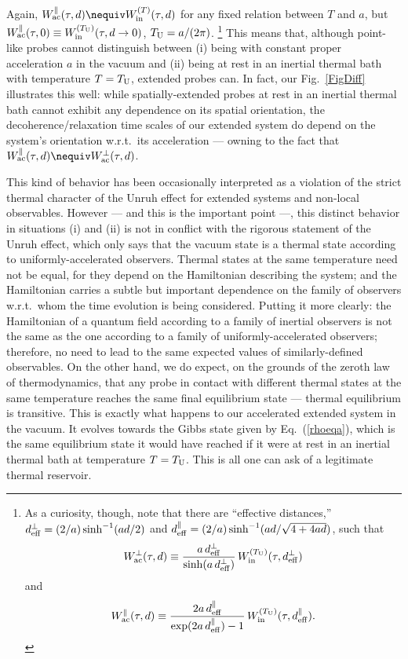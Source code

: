 \documentclass[]{nature}
\begin{document}
{Again, $W^{\parallel}_{\rm ac}(\tau,d) \nequiv W^{(T)}_{\rm in}(\tau,d)$ for any fixed relation between $T$ and $a$, 
but $W^\parallel_{\rm ac}(\tau,0) \equiv W^{(T_{\rm U})}_{\rm in}
(\tau,d\to 0)$,
$T_{\rm U} = a/(2\pi)$.
\footnote{As a curiosity, though, note that  there are ``effective distances,''
$d^\bot_{\rm eff} = (2/a) \sinh^{-1}(ad/2)$
and $d^\parallel_{\rm eff} = (2/a) \sinh^{-1}(ad/\sqrt{4+4ad})$,
 such that
 $$W^{\bot}_{\rm ac}(\tau,d) \equiv \frac{a\,d^\bot_{\rm eff}}{\sinh(a\,d^\bot_{\rm eff})}\,W^{(T_{\rm U})}_{\rm in}(\tau,d^\bot_{\rm eff})$$ 
 and
 $$W^{\parallel}_{\rm ac}(\tau,d) \equiv  
 \frac{2a\,d^\parallel_{\rm eff}}{\exp({2a\,d^\parallel_{\rm eff}})-1}\,W^{(T_{\rm U})}_{\rm in}(\tau,d^\parallel_{\rm eff}).$$}
This means that, although point-like probes cannot distinguish between 
(i) being with constant proper acceleration $a$ in the vacuum and (ii) being
at rest in an inertial thermal bath with temperature $T = T_{\rm U} $, extended probes can. 
In fact, our Fig.~\ref{FigDiff} illustrates this well: 
while spatially-extended probes at rest in an inertial thermal bath cannot exhibit any 
dependence on its spatial orientation, the decoherence/relaxation
time scales of our extended system do depend on the system's orientation w.r.t.\ its acceleration --- owning to the 
fact that $W^{\parallel}_{\rm ac}(\tau,d) \nequiv W^{\bot}_{\rm ac}(\tau,d)$. 

This kind of behavior 
has been occasionally interpreted as
a violation of the strict thermal character of the Unruh effect for extended systems and non-local observables.
However --- and this is the important point ---, this distinct behavior in situations (i) and (ii) 
is  not in conflict with the rigorous statement of the Unruh effect, which only says that
 the vacuum state is a  thermal state 
according to uniformly-accelerated observers. Thermal states at the same temperature 
need not be equal, for they depend on the
Hamiltonian describing the system; and the Hamiltonian carries a subtle but important 
dependence on the family of observers
w.r.t.\ whom the time evolution is being considered. Putting it more clearly: the 
Hamiltonian of a quantum field according
to a family of inertial observers is not the same as the one according to a family
 of uniformly-accelerated observers; therefore, no need
to lead to the same expected values of similarly-defined observables. On the other 
hand, we do expect, on the grounds of the zeroth law of
thermodynamics, that any probe in contact with different thermal states at the
 same temperature reaches the same final equilibrium state
--- thermal equilibrium is  transitive. This
is exactly what happens to our accelerated extended system in the vacuum. 
It evolves towards 
the Gibbs state given by Eq.~(\ref{rhoeqa}), which is the same equilibrium state it would have
reached if it were at rest in an inertial thermal bath at temperature $T = T_{\rm U}$. This is all one can ask of
a legitimate thermal reservoir.

}
\end{document}
